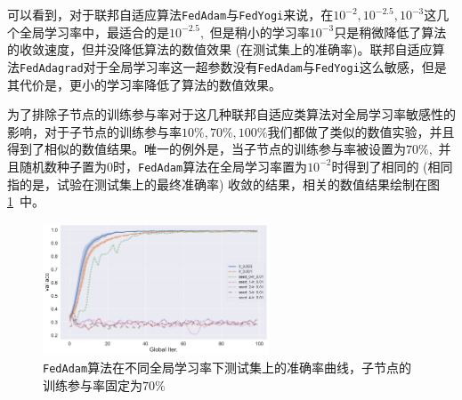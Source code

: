 可以看到，对于联邦自适应算法\texttt{FedAdam}与\texttt{FedYogi}来说，在$10^{-2}, 10^{-2.5}, 10^{-3}$这几个全局学习率中，最适合的是$10^{-2.5},$ 但是稍小的学习率$10^{-3}$只是稍微降低了算法的收敛速度，但并没降低算法的数值效果 (在测试集上的准确率)。联邦自适应算法\texttt{FedAdagrad}对于全局学习率这一超参数没有\texttt{FedAdam}与\texttt{FedYogi}这么敏感，但是其代价是，更小的学习率降低了算法的数值效果。

为了排除子节点的训练参与率对于这几种联邦自适应类算法对全局学习率敏感性的影响，对于子节点的训练参与率$10\%, 70\%, 100\%$我们都做了类似的数值实验，并且得到了相似的数值结果。唯一的例外是，当子节点的训练参与率被设置为$70\%,$ 并且随机数种子置为$0$时，\texttt{FedAdam}算法在全局学习率置为$10^{-2}$时得到了相同的 (相同指的是，试验在测试集上的最终准确率) 收敛的结果，相关的数值结果绘制在图\ref{fig:adam-sample-70-compare-lr-val-acc}~中。

\begin{figure}[ht]
    \centering
    \includegraphics[width=0.6\textwidth]{figures/adam-sample-70-compare-lr-val-acc.pdf}
    \caption{\texttt{FedAdam}算法在不同全局学习率下测试集上的准确率曲线，子节点的训练参与率固定为$70\%$}
    \label{fig:adam-sample-70-compare-lr-val-acc}
\end{figure}
